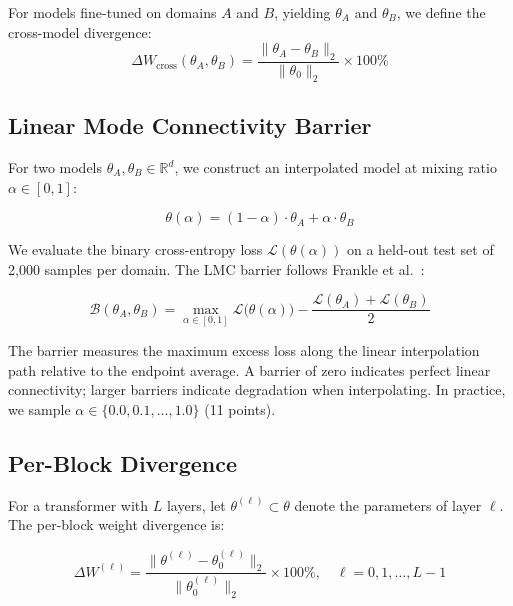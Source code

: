 \documentclass[11pt,a4paper]{article}
\begin{document}
For models fine-tuned on domains $A$ and $B$, yielding $\theta_A$ and $\theta_B$, we define the cross-model divergence:
\begin{equation}
\Delta W_{\text{cross}}(\theta_A, \theta_B) = \frac{\|\theta_A - \theta_B\|_2}{\|\theta_0\|_2} \times 100\%
\end{equation}

\subsection{Linear Mode Connectivity Barrier}

For two models $\theta_A, \theta_B \in \mathbb{R}^d$, we construct an interpolated model at mixing ratio $\alpha \in [0, 1]$:

\begin{equation}\label{eq:interp}
\theta(\alpha) = (1 - \alpha) \cdot \theta_A + \alpha \cdot \theta_B
\end{equation}

We evaluate the binary cross-entropy loss $\mathcal{L}(\theta(\alpha))$ on a held-out test set of 2,000 samples per domain. The LMC barrier follows Frankle et al.~\cite{frankle2020lmc}:

\begin{equation}\label{eq:barrier}
\boxed{\mathcal{B}(\theta_A, \theta_B) = \max_{\alpha \in [0,1]} \mathcal{L}\big(\theta(\alpha)\big) - \frac{\mathcal{L}(\theta_A) + \mathcal{L}(\theta_B)}{2}}
\end{equation}

The barrier measures the maximum excess loss along the linear interpolation path relative to the endpoint average. A barrier of zero indicates perfect linear connectivity; larger barriers indicate degradation when interpolating. In practice, we sample $\alpha \in \{0.0, 0.1, \dots, 1.0\}$ (11 points).

\subsection{Per-Block Divergence}

For a transformer with $L$ layers, let $\theta^{(\ell)} \subset \theta$ denote the parameters of layer $\ell$. The per-block weight divergence is:

\begin{equation}\label{eq:perblock}
\Delta W^{(\ell)} = \frac{\|\theta^{(\ell)} - \theta_0^{(\ell)}\|_2}{\|\theta_0^{(\ell)}\|_2} \times 100\%, \quad \ell = 0, 1, \dots, L-1
\end{equation}
\end{document}
